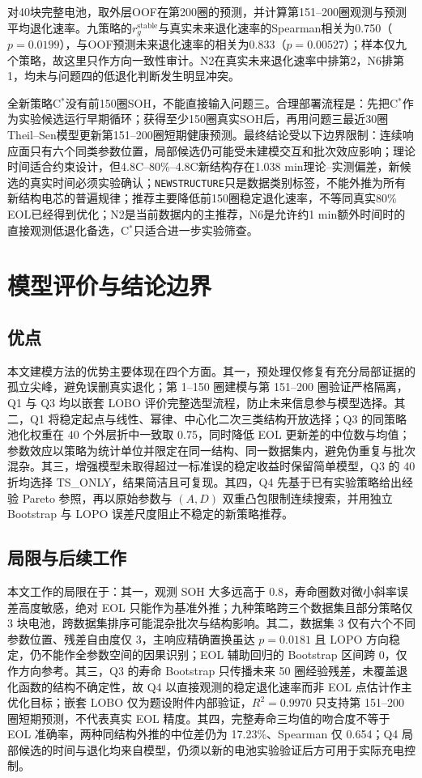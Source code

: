 \documentclass[withoutpreface]{cumcmthesis}
\begin{document}
对40块完整电池，取外层OOF在第200圈的预测，并计算第151--200圈观测与预测平均退化速率。九策略的$r_g^{\mathrm{stable}}$与真实未来退化速率的Spearman相关为0.750（$p=0.0199$），与OOF预测未来退化速率的相关为0.833（$p=0.00527$）；样本仅九个策略，故这里只作方向一致性审计。N2在真实未来退化速率中排第2，N6排第1，均未与问题四的低退化判断发生明显冲突。

全新策略C$^*$没有前150圈SOH，不能直接输入问题三。合理部署流程是：先把C$^*$作为实验候选运行早期循环；获得至少150圈真实SOH后，再用问题三最近30圈Theil--Sen模型更新第151--200圈短期健康预测。最终结论受以下边界限制：连续响应面只有六个同类参数位置，局部候选仍可能受未建模交互和批次效应影响；理论时间适合约束设计，但4.8C--80\%--4.8C新结构存在1.038 min理论--实测偏差，新候选的真实时间必须实验确认；\texttt{NEWSTRUCTURE}只是数据类别标签，不能外推为所有新结构电芯的普遍规律；推荐主要降低前150圈稳定退化速率，不等同真实80\% EOL已经得到优化；N2是当前数据内的主推荐，N6是允许约1 min额外时间时的直接观测低退化备选，C$^*$只适合进一步实验筛查。

\section{模型评价与结论边界}

\subsection{优点}

本文建模方法的优势主要体现在四个方面。其一，预处理仅修复有充分局部证据的孤立尖峰，避免误删真实退化；第 1--150 圈建模与第 151--200 圈验证严格隔离，Q1 与 Q3 均以嵌套 LOBO 评价完整选型流程，防止未来信息参与模型选择。其二，Q1 将稳定起点与线性、幂律、中心化二次三类结构开放选择；Q3 的同策略池化权重在 40 个外层折中一致取 0.75，同时降低 EOL 更新差的中位数与均值；参数效应以策略为统计单位并限定在同一结构、同一数据集内，避免伪重复与批次混杂。其三，增强模型未取得超过一标准误的稳定收益时保留简单模型，Q3 的 40 折均选择 TS\_ONLY，结果简洁且可复现。其四，Q4 先基于已有实验策略给出经验 Pareto 参照，再以原始参数与 $(A,D)$ 双重凸包限制连续搜索，并用独立 Bootstrap 与 LOPO 误差尺度阻止不稳定的新策略推荐。

\subsection{局限与后续工作}

本文工作的局限在于：其一，观测 SOH 大多远高于 0.8，寿命圈数对微小斜率误差高度敏感，绝对 EOL 只能作为基准外推；九种策略跨三个数据集且部分策略仅 3 块电池，跨数据集排序可能混杂批次与结构影响。其二，数据集 3 仅有六个不同参数位置、残差自由度仅 3，主响应精确置换虽达 $p=0.0181$ 且 LOPO 方向稳定，仍不能作全参数空间的因果识别；EOL 辅助回归的 Bootstrap 区间跨 0，仅作方向参考。其三，Q3 的寿命 Bootstrap 只传播未来 50 圈经验残差，未覆盖退化函数的结构不确定性，故 Q4 以直接观测的稳定退化速率而非 EOL 点估计作主优化目标；嵌套 LOBO 仅为题设附件内部验证，$R^2=0.9970$ 只支持第 151--200 圈短期预测，不代表真实 EOL 精度。其四，完整寿命三均值的吻合度不等于 EOL 准确率，两种同结构外推的中位差仍为 17.23\%、Spearman 仅 0.654；Q4 局部候选的时间与退化均来自模型，仍须以新的电池实验验证后方可用于实际充电控制。
\end{document}
